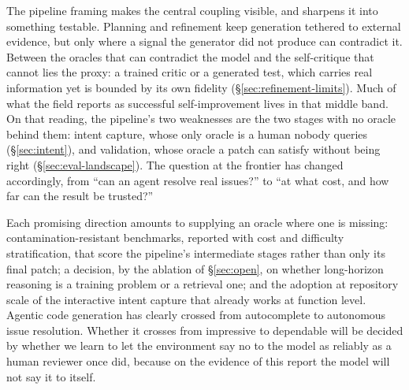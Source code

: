 \documentclass[
  english,        %
  font=times,     %
  twocolumn,      %
]{tumarticle}
\begin{document}
The pipeline framing makes the central coupling visible, and sharpens it into
something testable. Planning and refinement keep generation tethered to external
evidence, but only where a signal the generator did not produce can contradict it.
Between the oracles that can contradict the model and the self-critique that
cannot lies the proxy: a trained critic or a generated test, which carries real
information yet is bounded by its own fidelity (\S\ref{sec:refinement-limits}).
Much of what the field reports as successful self-improvement lives in that middle
band. On that reading, the pipeline's two weaknesses are the two stages with no
oracle behind them: intent capture, whose only oracle is a human nobody queries
(\S\ref{sec:intent}), and validation, whose oracle a patch can satisfy without
being right (\S\ref{sec:eval-landscape}). The question at the frontier has changed
accordingly, from ``can an agent resolve real issues?'' to ``at what cost, and how
far can the result be trusted?''

Each promising direction amounts to supplying an oracle where one is missing:
contamination-resistant benchmarks, reported with cost and difficulty
stratification, that score the pipeline's intermediate stages rather than only
its final patch; a decision, by the ablation of \S\ref{sec:open}, on whether
long-horizon reasoning is a training problem or a retrieval one; and the adoption
at repository scale of the interactive intent capture that already works at
function level. Agentic code generation has clearly crossed from
autocomplete to autonomous issue resolution. Whether it crosses from impressive to
dependable will be decided by whether we learn to let the environment say no to
the model as reliably as a human reviewer once did, because on the evidence of this report
the model will not say it to itself.



\end{document}
